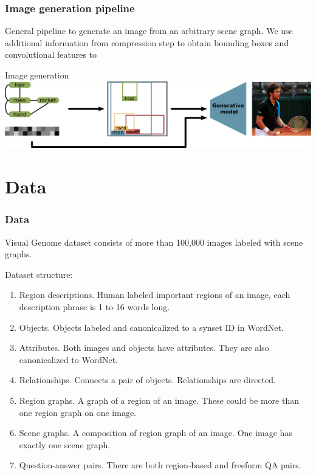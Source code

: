 \documentclass[10pt]{beamer}
\begin{document}
\begin{frame}
    \frametitle{Image generation pipeline}

    General pipeline to generate an image from an arbitrary scene graph. We use additional information from compression step to obtain bounding boxes and convolutional features to 
    \begin{block}{Image generation}
        \includegraphics[width=\textwidth]{figure/image-generation-from-sg.png}
    \end{block}
\end{frame}

\section{Data}
\begin{frame}
    \frametitle{Data}

    Visual Genome dataset consists of more than 100,000 images labeled with scene graphs.

    Dataset structure:
    \begin{enumerate}
        \item Region descriptions. Human labeled important regions of an image, each description phrase is 1 to 16 words long.
        \item Objects. Objects labeled and canonicalized to a synset ID in WordNet.
        \item Attributes. Both images and objects have attributes. They are also canonicalized to WordNet.
        \item Relationships. Connects a pair of objects. Relationships are directed.
        \item Region graphs. A graph of a region of an image. These could be more than one region graph on one image.
        \item Scene graphs. A composition of region graph of an image. One image has exactly one scene graph.
        \item Question-answer pairs. There are both region-based and freeform QA pairs.
    \end{enumerate}
\end{frame}
\end{document}
